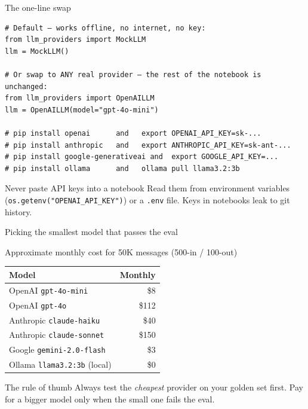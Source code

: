 \documentclass[aspectratio=169,11pt]{beamer}
\begin{document}
\begin{frame}[fragile]{The one-line swap}
\begin{lstlisting}
# Default — works offline, no internet, no key:
from llm_providers import MockLLM
llm = MockLLM()

# Or swap to ANY real provider — the rest of the notebook is unchanged:
from llm_providers import OpenAILLM
llm = OpenAILLM(model="gpt-4o-mini")

# pip install openai      and   export OPENAI_API_KEY=sk-...
# pip install anthropic   and   export ANTHROPIC_API_KEY=sk-ant-...
# pip install google-generativeai and  export GOOGLE_API_KEY=...
# pip install ollama      and   ollama pull llama3.2:3b
\end{lstlisting}
  \begin{alertblock}{Never paste API keys into a notebook}
    Read them from environment variables (\texttt{os.getenv("OPENAI\_API\_KEY")})
    or a \texttt{.env} file. Keys in notebooks leak to git history.
  \end{alertblock}
\end{frame}

\begin{frame}{Picking the smallest model that passes the eval}
  \begin{exampleblock}{Approximate monthly cost for 50K messages (500-in / 100-out)}
    \footnotesize
    \begin{tabular}{lr}
      \toprule
      Model & Monthly \\
      \midrule
      OpenAI \texttt{gpt-4o-mini}       & \$8        \\
      OpenAI \texttt{gpt-4o}            & \$112      \\
      Anthropic \texttt{claude-haiku}   & \$40       \\
      Anthropic \texttt{claude-sonnet}  & \$150      \\
      Google \texttt{gemini-2.0-flash}  & \$3        \\
      Ollama \texttt{llama3.2:3b} (local) & \$0      \\
      \bottomrule
    \end{tabular}
  \end{exampleblock}
  \vspace{4pt}
  \begin{block}{The rule of thumb}
    Always test the \emph{cheapest} provider on your golden set first.
    Pay for a bigger model only when the small one fails the eval.
  \end{block}
\end{frame}
\end{document}
